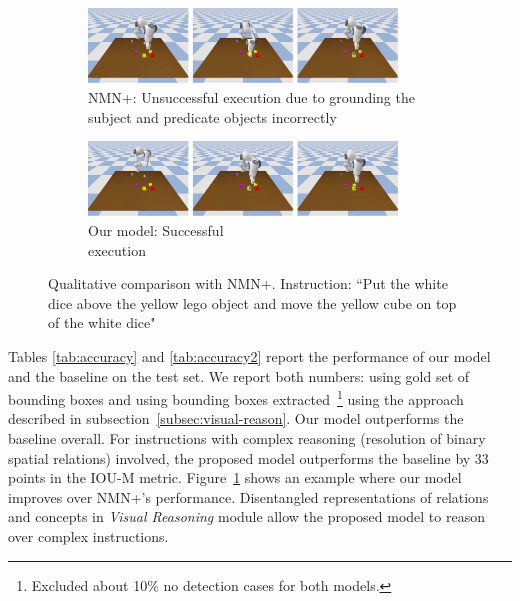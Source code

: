 \begin{figure}
    \centering
    \hfill
    \begin{subfigure}{\textwidth}
        \centering
        \includegraphics[width=0.9\textwidth]{assets/nmn-comb.png}
        \caption{NMN+: Unsuccessful execution due to grounding the subject and predicate objects incorrectly}
    \end{subfigure}
    \hfill
    \begin{subfigure}{\textwidth}
        \centering
        \includegraphics[width=0.9\textwidth]{assets/ours-comb.png}
        \caption{Our model: Successful \\ execution}
    \end{subfigure}
    \hfill

    \caption{Qualitative comparison with NMN+. Instruction: “Put the white dice above the yellow lego object and move the yellow cube on top of the white dice"}
    \label{fig:nmn-qual}
\end{figure}


Tables \ref{tab:accuracy} and \ref{tab:accuracy2} report the performance of our model and the baseline on the test set. We report both numbers: using gold set of bounding boxes and using bounding boxes extracted~\footnote{Excluded about 10\% no detection cases for both models.} using the approach described in subsection~\ref{subsec:visual-reason}. Our model outperforms the baseline overall. For instructions with complex reasoning (resolution of binary spatial relations) involved, the proposed model outperforms the baseline by $33$ points in the IOU-M metric. Figure~\ref{fig:nmn-qual} shows an example where our model improves over NMN+'s performance.
%
Disentangled representations of relations and concepts in \textit{Visual Reasoning} module allow the proposed model to reason over complex instructions.

